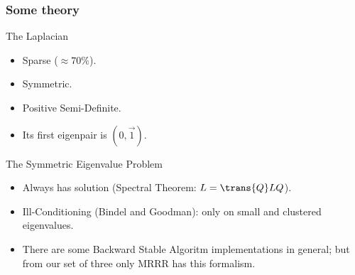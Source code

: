 \begin{frame}
  \frametitle{Some theory}
  \begin{block}{The Laplacian}
    \begin{itemize}
    \item Sparse ($\approx 70\%$).
    \item Symmetric. 
    \item Positive Semi-Definite.
    \item Its first eigenpair is $(0,\vec{1}).$
    \end{itemize}
  \end{block}
  \begin{block}{The Symmetric Eigenvalue Problem}
    \begin{itemize}
    \item Always has solution (Spectral Theorem: $L = \trans{Q}LQ$).
    \item Ill-Conditioning (Bindel and Goodman): only on small and clustered eigenvalues. 
    \item There are some Backward Stable Algoritm implementations in general; but from our set of three only MRRR has this formalism.
    \end{itemize}
  \end{block}  
\end{frame}
